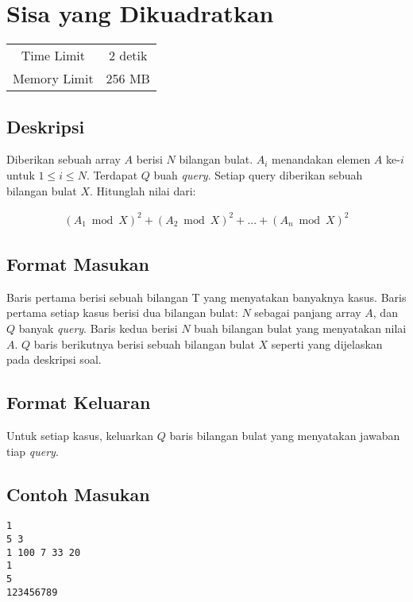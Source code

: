\documentclass{article}
\begin{document}
\section*{\hfil Sisa yang Dikuadratkan\hfil}

\begin{center}
\begin{tabular}{ |cc| } 
 \hline
 Time Limit & 2 detik \\ 
 Memory Limit & 256 MB \\
 \hline
\end{tabular}
\end{center}

\subsection*{Deskripsi}
Diberikan sebuah array $A$ berisi $N$ bilangan bulat. $A_{i}$ menandakan elemen $A$ ke-$i$ untuk $1 \leq i \leq N$. Terdapat $Q$ buah \textit{query}. Setiap query diberikan sebuah bilangan bulat $X$. Hitunglah nilai dari:

\begin{gather*} 
(A_{1} \bmod X)^2 + (A_{2} \bmod X)^2 + ... + (A_{n} \bmod X)^2
\end{gather*} 

\subsection*{Format Masukan}
\par Baris pertama berisi sebuah bilangan T yang menyatakan banyaknya kasus.
\newline Baris pertama setiap kasus berisi dua bilangan bulat: $N$ sebagai panjang array $A$, dan $Q$ banyak \textit{query}.
\newline Baris kedua berisi $N$ buah bilangan bulat yang menyatakan nilai $A$.
\newline $Q$ baris berikutnya berisi sebuah bilangan bulat $X$ seperti yang dijelaskan pada deskripsi soal.

\subsection*{Format Keluaran}

\par Untuk setiap kasus, keluarkan $Q$ baris bilangan bulat yang menyatakan jawaban tiap \textit{query}.

\subsection*{Contoh Masukan}
\begin{lstlisting}
1
5 3
1 100 7 33 20
1
5
123456789
\end{lstlisting}
\end{document}
